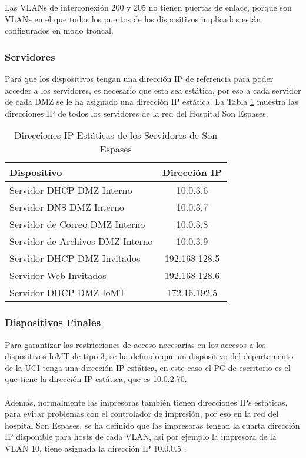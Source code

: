 Las VLANs de interconexión 200 y 205 no tienen puertas de enlace, porque son VLANs en el que todos los puertos de los dispositivos implicados están configurados en modo troncal.

\subsubsection{Servidores}
Para que los dispositivos tengan una dirección IP de referencia para poder acceder a los servidores, es necesario que esta sea estática, por eso a cada servidor de cada DMZ se le ha asignado una dirección IP estática.
La Tabla \ref{tab:servidoresSE} muestra las direcciones IP de todos los servidores de la red del Hospital Son Espases.
\begin{table}[H]
    \centering
    \scriptsize
    \begin{tabular}{|l|c|}
        \hline
        \textbf{Dispositivo} & \textbf{Dirección IP} \\
        \hline
        Servidor DHCP DMZ Interno & 10.0.3.6 \\
        \hline
        Servidor DNS DMZ Interno & 10.0.3.7 \\
        \hline
        Servidor de Correo DMZ Interno & 10.0.3.8 \\
        \hline
        Servidor de Archivos DMZ Interno & 10.0.3.9 \\
        \hline
        Servidor DHCP DMZ Invitados & 192.168.128.5 \\
        \hline
        Servidor Web Invitados & 192.168.128.6 \\
        \hline
        Servidor DHCP DMZ IoMT & 172.16.192.5 \\
        \hline
    \end{tabular}
    \caption{Direcciones IP Estáticas de los Servidores de Son Espases}
    \label{tab:servidoresSE}
\end{table}

\subsubsection{Dispositivos Finales}
Para garantizar las restricciones de acceso necesarias en los accesos a los dispositivos IoMT de tipo 3, se ha definido que un dispositivo del departamento de la UCI tenga una dirección IP estática, 
en este caso el PC de escritorio es el que tiene la dirección IP estática, que es 10.0.2.70. 
\\ \\
Además, normalmente las impresoras también tienen direcciones IPs estáticas, para evitar problemas con el controlador de impresión, por eso en la red del hospital Son Espases, se ha 
definido que las impresoras tengan la cuarta dirección IP disponible para hosts de cada VLAN, así por ejemplo la impresora de la VLAN 10, tiene asignada la dirección IP 10.0.0.5 \cite{Impresoras}.


